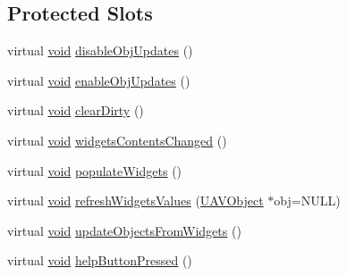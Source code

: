 \subsection*{\-Protected \-Slots}
\begin{DoxyCompactItemize}
\item 
virtual \hyperlink{group___u_a_v_objects_plugin_ga444cf2ff3f0ecbe028adce838d373f5c}{void} \hyperlink{group___u_a_v_object_widget_utils_ga32ef249bc6ebe47b9fe60812e09476da}{disable\-Obj\-Updates} ()
\item 
virtual \hyperlink{group___u_a_v_objects_plugin_ga444cf2ff3f0ecbe028adce838d373f5c}{void} \hyperlink{group___u_a_v_object_widget_utils_gafff7f205068866010a484ee95730b65b}{enable\-Obj\-Updates} ()
\item 
virtual \hyperlink{group___u_a_v_objects_plugin_ga444cf2ff3f0ecbe028adce838d373f5c}{void} \hyperlink{group___u_a_v_object_widget_utils_gae4dd854e5d93e1b268ffc473a7392493}{clear\-Dirty} ()
\item 
virtual \hyperlink{group___u_a_v_objects_plugin_ga444cf2ff3f0ecbe028adce838d373f5c}{void} \hyperlink{group___u_a_v_object_widget_utils_ga6860b8b666afa5a3254fd84ab1f9119e}{widgets\-Contents\-Changed} ()
\item 
virtual \hyperlink{group___u_a_v_objects_plugin_ga444cf2ff3f0ecbe028adce838d373f5c}{void} \hyperlink{group___u_a_v_object_widget_utils_gaa3d55f7941db619b9872b0ffdc78ebde}{populate\-Widgets} ()
\item 
virtual \hyperlink{group___u_a_v_objects_plugin_ga444cf2ff3f0ecbe028adce838d373f5c}{void} \hyperlink{group___u_a_v_object_widget_utils_ga7682451eb1e003d337c679fc8a36c6e1}{refresh\-Widgets\-Values} (\hyperlink{class_u_a_v_object}{\-U\-A\-V\-Object} $\ast$obj=\-N\-U\-L\-L)
\item 
virtual \hyperlink{group___u_a_v_objects_plugin_ga444cf2ff3f0ecbe028adce838d373f5c}{void} \hyperlink{group___u_a_v_object_widget_utils_ga4e59f88c43451ae4282077f9a9214cea}{update\-Objects\-From\-Widgets} ()
\item 
virtual \hyperlink{group___u_a_v_objects_plugin_ga444cf2ff3f0ecbe028adce838d373f5c}{void} \hyperlink{group___u_a_v_object_widget_utils_ga63ae96f50a8ed78f60d382dede4676d7}{help\-Button\-Pressed} ()
\end{DoxyCompactItemize}
